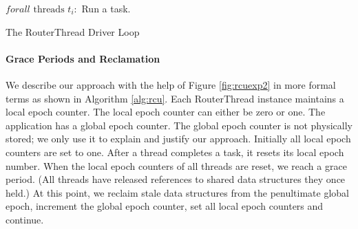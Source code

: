 \documentclass[a4paper,marginparwidth=50pt,marginparsep=10pt]{article}
\begin{document}
\begin{algorithm}[float=tph]
\begin{algorithmic}
{
\STATE $forall \mbox{ threads }t_i:$
\STATE Run a task.
\ENDWHILE
}
\caption{The RouterThread Driver Loop}
\label{alg:driverloop}
\end{algorithmic}
\end{algorithm}

\paragraph{Grace Periods and Reclamation}
We describe our approach with the help of Figure \ref{fig:rcuexp2} in more formal terms as shown in Algorithm \ref{alg:rcu}. Each RouterThread instance maintains a local epoch counter. The local epoch counter can either be zero or one. The application has a global epoch counter. The global epoch counter is not physically stored; we only use it to explain and justify our approach. Initially all local epoch counters are set to one. After a thread completes a task, it resets its local epoch number. When the local epoch counters of all threads are reset, we reach a grace period. (All threads have released references to shared data structures they once held.) At this point, we reclaim stale data structures from the penultimate global epoch, increment the global epoch counter, set all local epoch counters and continue.
\end{document}
